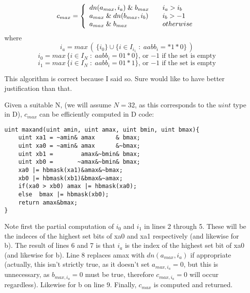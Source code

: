 \documentclass{article}
\begin{document}
\begin{equation*}
c_{max} = \left\{
\begin{array}{l l}
dn(a_{max},i_a) \;\&\; b_{max} & \quad i_a > i_b \\
a_{max} \;\&\; dn(b_{max},i_b) & \quad i_b > -1 \\ 
a_{max} \;\&\; b_{max}         & \quad otherwise
\end{array}\right.
\end{equation*}
where
\begin{equation}\label{ia-maxand}
i_a = max \, ( \, \{i_0\} \cup \{i \in I_{i_1}\; : \; 
            aabb_i = *1*0\} \, ) 
\end{equation}
\begin{equation*}
i_0 = max \, \{i \in I_N\; : \; 
aabb_i = 01*0\},\,
\text{or $-1$ if the set is empty}
\end{equation*}
\begin{equation*}
i_1 = max \, \{i\in I_N\; : \; 
aabb_i = 01*1\},\,
\text{or $-1$ if the set is empty}
\end{equation*}
\vspace{0pt}

This algorithm is correct because I said so. Sure would like to have 
better justification than that.
\vspace{10pt}

Given a suitable N, (we will assume $N=32$, as this corresponds to the $uint$ 
type in D), $c_{max}$ can be efficiently computed in D code:
\begin{lstlisting}
uint maxand(uint amin, uint amax, uint bmin, uint bmax){
    uint xa1 = ~amin& amax      & bmax;
    uint xa0 = ~amin& amax      &~bmax;
    uint xb1 =        amax&~bmin& bmax;
    uint xb0 =       ~amax&~bmin& bmax;
    xa0 |= hbmask(xa1)&amax&~bmax;
    xb0 |= hbmask(xb1)&bmax&~amax;
    if(xa0 > xb0) amax |= hbmask(xa0);
    else  bmax |= hbmask(xb0);
    return amax&bmax;
}
\end{lstlisting}

Note first the partial computation of $i_0$ and $i_1$ in lines 2 through 5. 
These will be the indeces of the highest set bits of xa0 and xa1 respectively 
(and likewise for b). The result of lines 6 and 7 is that $i_a$ is the index 
of the highest set bit of xa0 (and likewise for b). Line 8 replaces amax with
$dn(a_{max},i_a)$ if appropriate (actually, this isn't strictly true, as it 
doesn't set $a_{max, i_a} = 0$, but this is unnecessary, as $b_{max,i_a} = 0$
must be true, therefore $c_{max,i_a} = 0$ will occur regardless). 
Likewise for b on line 9. Finally, $c_{max}$ is computed and returned.
\end{document}
